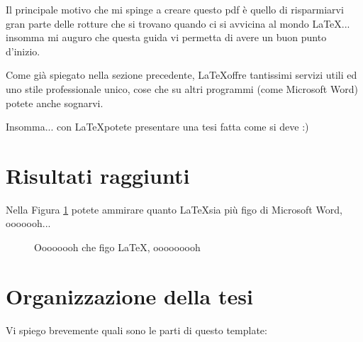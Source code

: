 Il principale motivo che mi spinge a creare questo pdf è quello di risparmiarvi gran parte delle rotture che si trovano quando ci si avvicina al mondo \LaTeX... insomma mi auguro che questa guida vi permetta di avere un buon punto d'inizio.

Come già spiegato nella sezione precedente, \LaTeX offre tantissimi servizi utili ed uno stile professionale unico, cose che su altri programmi (come Microsoft Word) potete anche sognarvi.

Insomma... con \LaTeX potete presentare una tesi fatta come si deve :)


\section{Risultati raggiunti}
\label{sec:intro3}

Nella Figura \ref{fig:latexVsWord} potete ammirare quanto \LaTeX sia più figo di Microsoft Word, ooooooh...

\begin{figure}[h] %
\centering %
\caption{Oooooooh che figo \LaTeX, ooooooooh} %
\label{fig:latexVsWord} %
\end{figure}


\section{Organizzazione della tesi}
\label{sec:intro4}

Vi spiego brevemente quali sono le parti di questo template:

